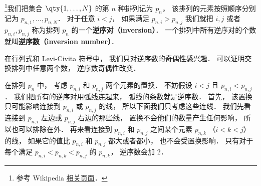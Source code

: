 
\begin{issues}
\issueDraft
\end{issues}


\footnote{参考 Wikipedia \href{https://en.wikipedia.org/wiki/Inversion_(discrete_mathematics)}{相关页面}．}我们把集合 $\qty{1,\dots,N}$ 的第 $n$ 种排列记为 $p_n$， 该排列的元素按照顺序分别记为 $p_{n,1}, \dots, p_{n,N}$． 对于任意 $i < j$， 如果满足 $p_{n,i} > p_{n,j}$ 我们就把 $i, j$ 或者 $p_{n,i}, p_{n,j}$ 称为排列 $p_n$ 的一个\textbf{逆序对（inversion）}． 一个排列中所有逆序对的个数就叫\textbf{逆序数（inversion number）}．

在行列式和 Levi-Civita 符号中， 我们只对逆序数的奇偶性感兴趣． 可以证明交换排列中任意两个数， 逆序数奇偶性改变． 

在排列 $p_n$ 中， 考虑 $p_{n,i}$ 和 $p_{n,j}$ 两个元素的置换． 不妨假设 $i < j$ 且 $p_{n,i} < p_{n,j}$． 我们把所有的逆序对用弧线连起来， 弧线的条数就是逆序数． 首先， 该置换只可能影响连接到 $p_{n,i}$ 或 $p_{n,j}$ 的线， 所以下面我们只考虑这些连线． 我们先看连接到 $p_{n,i}$ 左边或 $p_{n,j}$ 右边的那些线， 置换不会他们的数量产生任何影响， 所以也可以排除在外． 再来看连接到 $p_{n,i}$ 和 $p_{n,j}$ 之间某个元素 $p_{n, k}$ （$i < k < j$） 的线， 如果它的值比 $p_{n,i}$ 和 $p_{n,j}$ 都大或者都小， 也不会受置换影响． 只有对于每个满足 $p_{n,i} < p_{n,k} < p_{n,j}$ 的 $p_{n,k}$， 逆序数会加 2．
